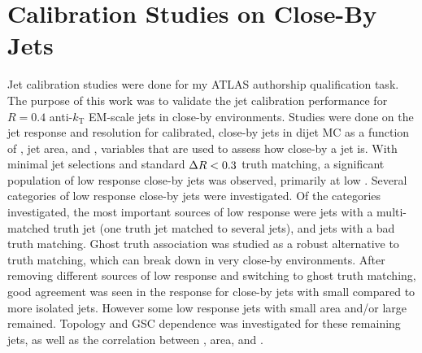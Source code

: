 \clearpage

\section{Calibration Studies on Close-By Jets}
Jet calibration studies were done for my ATLAS authorship qualification task. The purpose of this work was to validate the jet calibration performance for $R = 0.4$ anti-$k_\text{T}$ EM-scale jets in close-by environments. Studies were done on the jet response and resolution for calibrated, close-by jets in  dijet MC as a function of \DeltaRmin, jet area, and \fCloseby, variables that are used to assess how close-by a jet is. With minimal jet selections and standard $\Delta R < 0.3$ truth matching, a significant population of low response close-by jets was observed, primarily at low \pt. Several categories of low response close-by jets were investigated. Of the categories investigated, the most important sources of low response were jets with a multi-matched truth jet (one truth jet matched to several jets), and jets with a bad truth matching. Ghost truth association was studied as a robust alternative to \DeltaR truth matching, which can break down in very close-by environments. After removing different sources of low response and switching to ghost truth matching, good agreement was seen in the response for close-by jets with small \DeltaRmin compared to more isolated jets. However some low response jets with small area and/or large \fCloseby remained. Topology and GSC dependence was investigated for these remaining jets, as well as the correlation between \DeltaRmin, area, and \fCloseby.